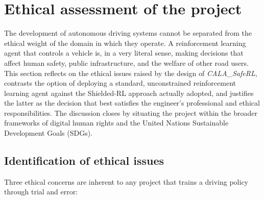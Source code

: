 \chapter{Ethical assessment of the project}\label{sec:ethics}

The development of autonomous driving systems cannot be separated from the ethical
weight of the domain in which they operate. A reinforcement learning agent that
controls a vehicle is, in a very literal sense, making decisions that affect human
safety, public infrastructure, and the welfare of other road users. This section
reflects on the ethical issues raised by the design of \textit{CALA\_SafeRL}, contrasts
the option of deploying a standard, unconstrained reinforcement learning agent against
the Shielded-RL approach actually adopted, and justifies the latter as the decision
that best satisfies the engineer's professional and ethical responsibilities. The
discussion closes by situating the project within the broader frameworks of digital
human rights and the United Nations Sustainable Development Goals (SDGs).

\section{Identification of ethical issues}\label{sec:ethics-issues}

Three ethical concerns are inherent to any project that trains a driving policy through
trial and error:

